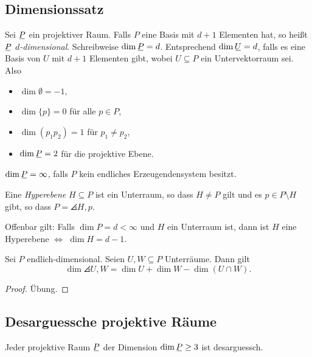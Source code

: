 \subsection{Dimensionssatz}
\begin{defn*}
 Sei $\proj$ ein projektiver Raum. Falls $P$ eine Basis mit $d+1$ Elementen hat, so heißt $\proj$ \emph{$d$-dimensional}. Schreibweise $\dim \proj = d$. Entsprechend $\dim \uproj = d$, falls es eine Basis von $U$ mit $d+1$ Elementen gibt, wobei $U \subseteq P$ ein Untervektorraum sei. Also
 \begin{itemize}
  \item $\dim \emptyset = -1$,
  \item $\dim \{ p \} = 0$ für alle $p \in P$,
  \item $\dim (p_1 p_2) = 1$ für $p_1 \ne p_2$,
  \item $\dim \proj = 2$ für die projektive Ebene.
 \end{itemize}
 $\dim \proj = \infty$, falls $P$ kein endliches Erzeugendensystem besitzt.
\end{defn*}

\begin{defn*}
 Eine \emph{Hyperebene} $H \subseteq P$ ist ein Unterraum, so dass $H \ne P$ gilt und es $p \in P \setminus H$ gibt, so dass $P = \angles{ H, p }$.
 
 Offenbar gilt: Falls $\dim P = d < \infty$ und $H$ ein Unterraum ist, dann ist $H$ eine Hyperebene $\Leftrightarrow$ $\dim H = d-1$.
\end{defn*}

\begin{thm}[Dimensionssatz]
 Sei $P$ endlich-dimensional. Seien $U, W \subseteq P$ Unterräume. Dann gilt
 \[ \dim \angles{U,W} = \dim U + \dim W - \dim (U \cap W). \]
\end{thm}

\begin{proof}
 Übung.
\end{proof}

\subsection{Desarguessche projektive Räume}
\begin{thm}
 Jeder projektive Raum $\proj$ der Dimension $\dim \proj \ge 3$ ist desarguessch.
\end{thm}

